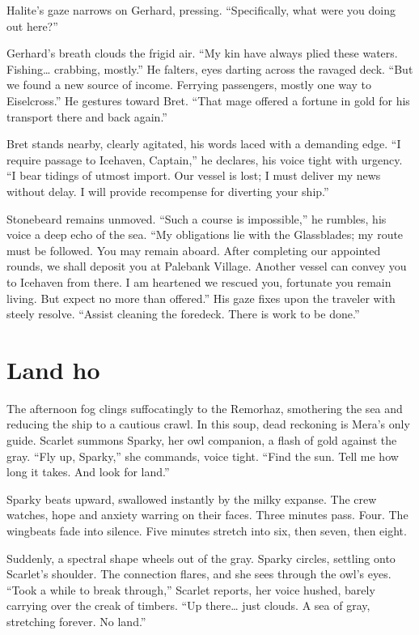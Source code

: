 \documentclass[
  letterpaper,12pt,twoside,twocolumn,openany,
  nodeprecatedcode,bg=full]{dndbook}
\begin{document}
Halite's gaze narrows on Gerhard, pressing. ``Specifically, what were
you doing out here?''

Gerhard's breath clouds the frigid air. ``My kin have always plied these
waters. Fishing\ldots{} crabbing, mostly.'' He falters, eyes darting
across the ravaged deck. ``But we found a new source of income. Ferrying
passengers, mostly one way to Eiselcross.'' He gestures toward Bret.
``That mage offered a fortune in gold for his transport there and back
again.''

Bret stands nearby, clearly agitated, his words laced with a demanding
edge. ``I require passage to Icehaven, Captain,'' he declares, his voice
tight with urgency. ``I bear tidings of utmost import. Our vessel is
lost; I must deliver my news without delay. I will provide recompense
for diverting your ship.''

Stonebeard remains unmoved. ``Such a course is impossible,'' he rumbles,
his voice a deep echo of the sea. ``My obligations lie with the
Glassblades; my route must be followed. You may remain aboard. After
completing our appointed rounds, we shall deposit you at Palebank
Village. Another vessel can convey you to Icehaven from there. I am
heartened we rescued you, fortunate you remain living. But expect no
more than offered.'' His gaze fixes upon the traveler with steely
resolve. ``Assist cleaning the foredeck. There is work to be done.''

\section{Land ho}\label{land-ho}

The afternoon fog clings suffocatingly to the Remorhaz, smothering the
sea and reducing the ship to a cautious crawl. In this soup, dead
reckoning is Mera's only guide. Scarlet summons Sparky, her owl
companion, a flash of gold against the gray. ``Fly up, Sparky,'' she
commands, voice tight. ``Find the sun. Tell me how long it takes. And
look for land.''

Sparky beats upward, swallowed instantly by the milky expanse. The crew
watches, hope and anxiety warring on their faces. Three minutes pass.
Four. The wingbeats fade into silence. Five minutes stretch into six,
then seven, then eight.

Suddenly, a spectral shape wheels out of the gray. Sparky circles,
settling onto Scarlet's shoulder. The connection flares, and she sees
through the owl's eyes. ``Took a while to break through,'' Scarlet
reports, her voice hushed, barely carrying over the creak of timbers.
``Up there\ldots{} just clouds. A sea of gray, stretching forever. No
land.''
\end{document}
